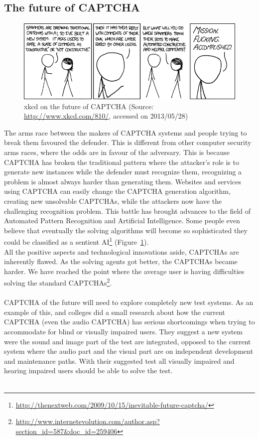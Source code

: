 \documentclass[pdftex,a4paper,12pt,twoside]{report}
\theoremstyle{plain} \newtheorem{theorem}{Theorem} \newtheorem{proposition}{Proposition} \newtheorem{lemma}{Lemma} \newtheorem*{corollary}{Corollary}
\theoremstyle{definition} \newtheorem{definition}{Definition} \newtheorem{conjecture}{Conjecture} \newtheorem*{example}{Example} \newtheorem{algorithm}{Algorithm}
\theoremstyle{remark} \newtheorem*{remark}{Remark} \newtheorem*{note}{Note} \newtheorem{case}{Case}
\begin{document}
\subsection{The future of CAPTCHA}
\begin{figure}
	\centering
	\includegraphics[width=13.75cm]{./img/xkcd-captcha-evolution.png}
	\caption{xkcd on the future of CAPTCHA (Source: \url{http://www.xkcd.com/810/}, accessed on 2013/05/28)}
	\label{fig:xkcdCAPTCHA}
\end{figure}
The arms race between the makers of CAPTCHA systems and people trying to break them favoured the defender. This is different from other computer security arms races, where the odds are in favour of the adversary. This is because CAPTCHA has broken the traditional pattern where the attacker's role is to generate new instances while the defender must recognize them, recognizing a problem is almost always harder than generating them. Websites and services using CAPTCHA can easily change the CAPTCHA generation algorithm, creating new unsolvable CAPTCHAs, while the attackers now have the challenging recognition problem. This battle has brought advances to the field of Automated Pattern Recognition and Artificial Intelligence. Some people even believe that eventually the solving algorithms will become so sophisticated they could be classified as a sentient AI\footnote{\url{http://thenextweb.com/2009/10/15/inevitable-future-captcha/}} (Figure~\ref{fig:xkcdCAPTCHA}).\\
All the positive aspects and technological innovations aside, CAPTCHAs are inherently flawed. As the solving agents got better, the CAPTCHAs became harder. We have reached the point where the average user is having difficulties solving the standard CAPTCHAs\footnote{\url{http://www.internetevolution.com/author.asp?section_id=587&doc_id=259406}}. \\\\
CAPTCHA of the future will need to explore completely new test systems. As an example of this, \citep{Sauer2008} and colleges did a small research about how the current CAPTCHA (even the audio CAPTCHA) has serious shortcomings when trying to accommodate for blind or visually impaired users. They suggest a new system were the sound and image part of the test are integrated, opposed to the current system where the audio part and the visual part are on independent development and maintenance paths. With their suggested test all visually impaired and hearing impaired users should be able to solve the test.\\\\
\end{document}
